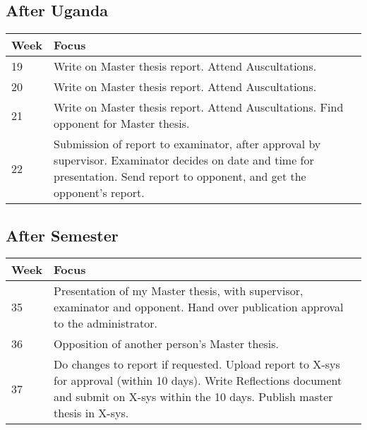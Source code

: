 \subsection{After Uganda}
\begin{center}
    \begin{tabular}{ | l | p{10cm} |}
    \hline
    Week & Focus \\ \hline
    19 & Write on Master thesis report. Attend Auscultations. \\ \hline 
    20 & Write on Master thesis report. Attend Auscultations. \\ \hline
    21 & Write on Master thesis report. Attend Auscultations. Find opponent for Master thesis. \\ \hline
    22 & Submission of report to examinator, after approval by supervisor. Examinator decides on date and time for presentation. Send report to opponent, and get the opponent's report. \\ \hline
    \end{tabular}
\end{center}

\subsection{After Semester}

\begin{center}
    \begin{tabular}{ | l | p{10cm} |}
    \hline
    Week & Focus \\ \hline
    35 & Presentation of my Master thesis, with supervisor, examinator and opponent. Hand over publication approval to the administrator. \\ \hline 
    36 & Opposition of another person's Master thesis. \\ \hline
    37 & Do changes to report if requested. Upload report to X-sys for approval (within 10 days). Write Reflections document and submit on X-sys within the 10 days. Publish master thesis in X-sys. \\ \hline
    \end{tabular}
\end{center}